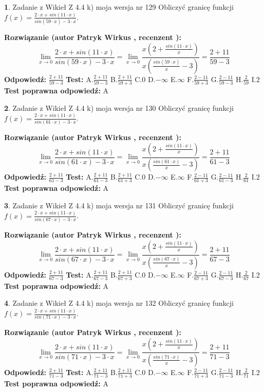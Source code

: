 \documentclass[12pt, a4paper]{article}
\theoremstyle{definition} %
\newtheorem{zad}{}
\newcommand{\zadStart}[1]{\begin{zad}#1\newline}
\newcommand{\zadStop}{\end{zad}}
\newcommand{\rozwStart}[2]{\noindent \textbf{Rozwiązanie (autor #1 , recenzent #2): }\newline}
\newcommand{\rozwStop}{\newline}
\newcommand{\odpStart}{\noindent \textbf{Odpowiedź:}\newline}
\newcommand{\odpStop}{\newline}
\newcommand{\testStart}{\noindent \textbf{Test:}\newline}
\newcommand{\testStop}{\newline}
\newcommand{\kluczStart}{\noindent \textbf{Test poprawna odpowiedź:}\newline}
\newcommand{\kluczStop}{\newline}
\begin{document}
\zadStart{Zadanie z Wikieł Z 4.4 k) moja wersja nr 129}
Obliczyć granicę funkcji $f(x)=\frac{2\cdot x +sin(11\cdot x)}{sin(59\cdot x) -3\cdot x}$.
\zadStop
\rozwStart{Patryk Wirkus}{}
$$\lim\limits_{x\to 0}\frac{2\cdot x +sin(11\cdot x)}{sin(59\cdot x) -3\cdot x}
=\lim\limits_{x\to 0}\frac{x(2+\frac{sin(11\cdot x)}{x})}{x(\frac{sin(59\cdot x)}{x}-3)}
=\frac{2+11}{59-3}$$
\rozwStop
\odpStart
$\frac{2+11}{59-3}$
\odpStop
\testStart
A.$\frac{2+11}{59-3}$
B.$\frac{2+11}{59+3}$
C.$0$
D.$-\infty$
E.$\infty$
F.$\frac{2-11}{59+3}$
G.$\frac{2-11}{59-3}$
H.$\frac{2}{59}$
I.$2$
\testStop
\kluczStart
A
\kluczStop



\zadStart{Zadanie z Wikieł Z 4.4 k) moja wersja nr 130}
Obliczyć granicę funkcji $f(x)=\frac{2\cdot x +sin(11\cdot x)}{sin(61\cdot x) -3\cdot x}$.
\zadStop
\rozwStart{Patryk Wirkus}{}
$$\lim\limits_{x\to 0}\frac{2\cdot x +sin(11\cdot x)}{sin(61\cdot x) -3\cdot x}
=\lim\limits_{x\to 0}\frac{x(2+\frac{sin(11\cdot x)}{x})}{x(\frac{sin(61\cdot x)}{x}-3)}
=\frac{2+11}{61-3}$$
\rozwStop
\odpStart
$\frac{2+11}{61-3}$
\odpStop
\testStart
A.$\frac{2+11}{61-3}$
B.$\frac{2+11}{61+3}$
C.$0$
D.$-\infty$
E.$\infty$
F.$\frac{2-11}{61+3}$
G.$\frac{2-11}{61-3}$
H.$\frac{2}{61}$
I.$2$
\testStop
\kluczStart
A
\kluczStop



\zadStart{Zadanie z Wikieł Z 4.4 k) moja wersja nr 131}
Obliczyć granicę funkcji $f(x)=\frac{2\cdot x +sin(11\cdot x)}{sin(67\cdot x) -3\cdot x}$.
\zadStop
\rozwStart{Patryk Wirkus}{}
$$\lim\limits_{x\to 0}\frac{2\cdot x +sin(11\cdot x)}{sin(67\cdot x) -3\cdot x}
=\lim\limits_{x\to 0}\frac{x(2+\frac{sin(11\cdot x)}{x})}{x(\frac{sin(67\cdot x)}{x}-3)}
=\frac{2+11}{67-3}$$
\rozwStop
\odpStart
$\frac{2+11}{67-3}$
\odpStop
\testStart
A.$\frac{2+11}{67-3}$
B.$\frac{2+11}{67+3}$
C.$0$
D.$-\infty$
E.$\infty$
F.$\frac{2-11}{67+3}$
G.$\frac{2-11}{67-3}$
H.$\frac{2}{67}$
I.$2$
\testStop
\kluczStart
A
\kluczStop



\zadStart{Zadanie z Wikieł Z 4.4 k) moja wersja nr 132}
Obliczyć granicę funkcji $f(x)=\frac{2\cdot x +sin(11\cdot x)}{sin(71\cdot x) -3\cdot x}$.
\zadStop
\rozwStart{Patryk Wirkus}{}
$$\lim\limits_{x\to 0}\frac{2\cdot x +sin(11\cdot x)}{sin(71\cdot x) -3\cdot x}
=\lim\limits_{x\to 0}\frac{x(2+\frac{sin(11\cdot x)}{x})}{x(\frac{sin(71\cdot x)}{x}-3)}
=\frac{2+11}{71-3}$$
\rozwStop
\odpStart
$\frac{2+11}{71-3}$
\odpStop
\testStart
A.$\frac{2+11}{71-3}$
B.$\frac{2+11}{71+3}$
C.$0$
D.$-\infty$
E.$\infty$
F.$\frac{2-11}{71+3}$
G.$\frac{2-11}{71-3}$
H.$\frac{2}{71}$
I.$2$
\testStop
\kluczStart
A
\kluczStop
\end{document}
